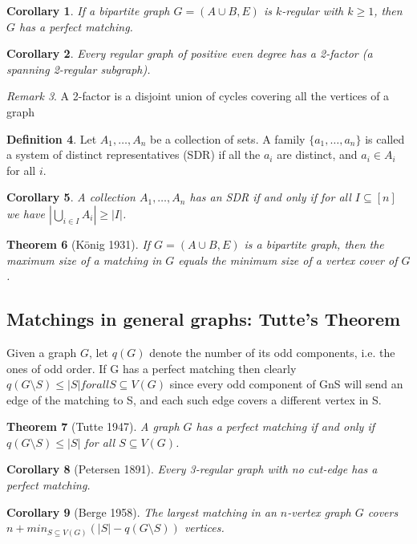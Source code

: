 \documentclass[11pt, fleqn, a4paper, landscape]{article}
\theoremstyle{plain} %
\newtheorem{thm}{Theorem}
\newtheorem{cor}[thm]{Corollary}
\theoremstyle{remark} %
\newtheorem{rem}[thm]{Remark}
\theoremstyle{definition} %
\newtheorem{defi}[thm]{Definition}
\begin{document}
\begin{multicols}{3}
\begin{cor}
If a bipartite graph $G = (A \cup B,E) $ is $k$-regular with $k \ge 1$, then $G$ has a perfect matching.
\end{cor}

\begin{cor}
Every regular graph of positive even degree has a 2-factor (a spanning 2-regular subgraph).
\end{cor}

\begin{rem}
A 2-factor is a disjoint union of cycles covering all the vertices of a graph
\end{rem}

\begin{defi}
Let $A_1, \dots ,A_n$ be a collection of sets. A family $\{a_1, \dots , a_n\}$  is called a system of distinct representatives (SDR) if all the $a_i$ are distinct, and $a_i \in A_i$ for all $i$.
\end{defi}

\begin{cor}
A collection $A_1, \dots ,A_n$ has an SDR if and only if for all $I \subseteq [n]$ we have $|\bigcup_{i\in I} A_i|\ge|I|$.
\end{cor}
\addtocounter{thm}{1}
\begin{thm}[König 1931]
If $G = (A \cup B,E)$ is a bipartite graph, then the maximum size of a
matching in $G$ equals the minimum size of a vertex cover of $G$.
\end{thm}

\subsection{Matchings in general graphs: Tutte’s Theorem}
Given a graph $G$, let $q(G)$ denote the number of its odd components, i.e. the ones of odd order. If G has a perfect matching then clearly
$q(G\setminus S) \le|S|for all S \subseteq V (G)$
since every odd component of GnS will send an edge of the matching to S, and each such edge covers a different vertex in S.

\begin{thm}[Tutte 1947]
A graph $G$ has a perfect matching if and only if $q(G\setminus S) \le|S|$ for
all $S \subseteq V (G)$.
\end{thm}

\begin{cor}[Petersen 1891]
Every 3-regular graph with no cut-edge has a perfect matching.
\end{cor}
\addtocounter{thm}{1}
\begin{cor}[Berge 1958]
The largest matching in an $n$-vertex graph $G$ covers $n+min_{S\subseteq V (G)}(|S|- q(G\setminus S))$ vertices.
\end{cor}


\end{multicols}
\end{document}
